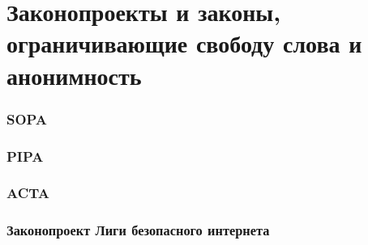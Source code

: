 \part{Законопроекты и законы, ограничивающие свободу слова и анонимность}
\section{SOPA}
\section{PIPA}
\section{ACTA}
\section{Законопроект Лиги безопасного интернета}